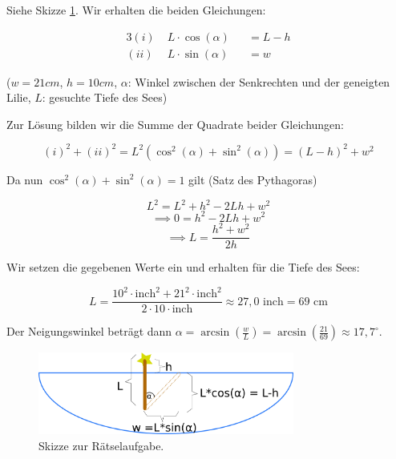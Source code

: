 \item Siehe Skizze \ref{ex-trigonometry-1-img-b}. Wir erhalten die beiden Gleichungen:

\begin{alignat*}{3}
(i)  \;  & L \cdot \cos(\alpha)  &&= L - h \\
(ii) \; &  L \cdot \sin(\alpha)  &&= w
\end{alignat*}

($w=21cm$, $h=10cm$, $\alpha$: Winkel zwischen der Senkrechten und der geneigten Lilie, $L$: gesuchte Tiefe des Sees)

Zur Lösung bilden wir die Summe der Quadrate beider Gleichungen:

$$(i)^2+(ii)^2 = L^2 (\cos^2(\alpha) + \sin^2(\alpha)) = (L-h)^2 + w^2$$

Da nun $\cos^2(\alpha) + \sin^2(\alpha) = 1$ gilt (Satz des Pythagoras)

$$ L^2 = L^2 + h^2 - 2Lh + w^2$$
$$\implies 0 = h^2-2Lh+w^2$$
$$\implies L = \frac{h^2+w^2}{2h}$$

Wir setzen die gegebenen Werte ein und erhalten für die Tiefe des Sees:

$$L=\frac{10^2\cdot\text{inch}^2 + 21^2\cdot\text{inch}^2}{2\cdot 10 \cdot\text{inch}} \approx 27,0 \text{ inch} = 69 \text{ cm}$$

Der Neigungswinkel beträgt dann $\alpha = \arcsin(\frac{w}{L})= \arcsin(\frac{21}{69}) \approx 17,7 ^ \circ$.

\begin{figure}[ht]
	\centering
	\includegraphics[width=0.75\textwidth]{../tex-snippets/ex-trigonometry-1-img-b.png}
	\caption{Skizze zur Rätselaufgabe.}
	\label{ex-trigonometry-1-img-b}
\end{figure}

